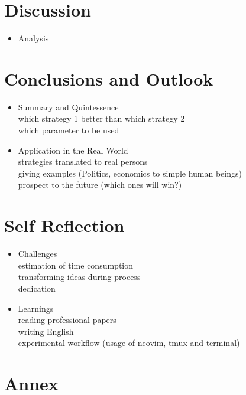 \documentclass{article}
\begin{document}
\newpage

\section{Discussion}
\begin{itemize}

	\item Analysis

\end{itemize}

\section{Conclusions and Outlook}
\begin{itemize}

	\item Summary and Quintessence\\
		which strategy 1 better than which strategy 2\\
		which parameter to be used\\

	\item Application in the Real World\\
		strategies translated to real persons\\
		giving examples (Politics, economics to simple human beings)\\
		prospect to the future (which ones will win?)

\end{itemize}

\section{Self Reflection}
\begin{itemize}

	\item Challenges\\
		estimation of time consumption\\
		transforming ideas during process\\
		dedication

	\item Learnings\\
		reading professional papers\\
		writing English\\
		experimental workflow (usage of neovim, tmux and terminal)

\end{itemize}

\section{Annex}
\end{document}
